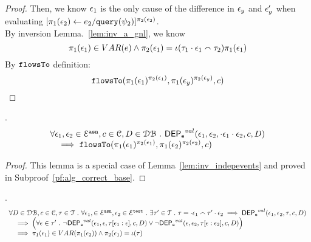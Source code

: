 \begin{proof}
Then, we know $\mathtt{\epsilon}_1$ is the only cause of the difference in $\mathtt{\epsilon}_y$ and $\mathtt{\epsilon}_y'$ when evaluating 
$[\mathrel{ \pi_1(\mathtt{\epsilon}_2) \leftarrow e_2 / {\tt query}(\psi_2) }]{}^{\pi_2(\mathtt{\epsilon}_2)}$.
%
\\
By inversion Lemma.~\ref{lem:inv_a_gnl}, we know
\[
  \pi_1(\mathtt{\epsilon}_1) \in VAR(e) \land {\pi_2(\ensuremath{\mathtt{\epsilon}}_1)} = \iota(\mathtt{\tau}_1 \cdot \mathtt{\epsilon}_1 \smallfrown \mathtt{\tau}_2) \pi_1(\mathtt{\epsilon}_1) 
\]
%
By $\mathtt{flowsTo}$ definition:
\[
  \mathtt{flowsTo}(\pi_1(\mathtt{\epsilon}_1)^{\pi_2(\mathtt{\epsilon}_1)}, \pi_1(\mathtt{\epsilon}_y)^{\pi_2(\mathtt{\epsilon}_y)}, c)
\]
\end{proof}
%
\begin{lem}.
	\label{lem:emptytrace_dep}
	\[
	\begin{array}{l}
		\forall \mathtt{\epsilon}_1, \mathtt{\epsilon}_2 \in \mathcal{E}^{\mathtt{{asn}}}, c \in \mathcal{C}, D \in \mathcal{DB} 
		~.~ 
		\mathsf{DEP_{\mathtt{e}}}^{val}(\mathtt{\epsilon}_1, \mathtt{\epsilon}_2, \cdot \mathtt{\epsilon}_1 \cdot \mathtt{\epsilon}_2,  c, D) 
		\\ \quad 
		\implies 
		\mathtt{flowsTo}(\pi_1(\mathtt{\epsilon}_1)^{\pi_2(\mathtt{\epsilon}_1)}, \pi_1(\mathtt{\epsilon}_2)^{\pi_2(\mathtt{\epsilon}_2)}, c)
	\end{array}
	\]
\end{lem}
\begin{proof}
	This lemma is a special case of Lemma~\ref{lem:inv_indepevents} and proved in Subproof~\ref{pf:alg_correct_base}.
\end{proof}
%
\begin{lem}.
	\label{lem:inv_indepeventstest}
	\[
	\begin{array}{l}
		\forall D \in \dbdom , c \in \cdom, \trace \in \mathcal{T} \st \forall \event_1,\in \eventset^{\asn}, \event_2 \in \eventset^{\test} \st
		 \exists \trace' \in \mathcal{T} \st \trace = \cdot \event_1 \tracecat \trace' \cdot \event_2
		\implies
		\eventdep^{val}(\event_1, \event_2, \trace, c, D) 
		\\ \quad 
		\implies 
		\left( \forall \event \in \trace' \st \neg \eventdep^{val}(\event_1, \event, \trace[\event_1:\event], c, D)
		\lor \neg \eventdep^{val}(\event, \event_2, \trace[\event:\event_2], c, D) 
		\right) 
		\\ \quad 
		\implies 
		\pi_1(\event_1) \in VAR(\pi_1(\event_2)) \land {\pi_2(\event_1)} = \llabel(\trace)
	\end{array}
	\]
\end{lem}
